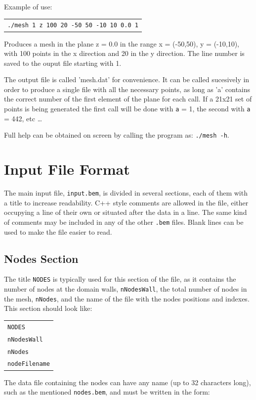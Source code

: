 \documentclass[12pt]{article}
\begin{document}
Example of use:

\begin{tabular}{l}
\texttt{./mesh 1 z 100 20 -50 50 -10 10 0.0 1}
\end{tabular}

Produces a mesh in the plane z = 0.0 in the range x = (-50,50), y = (-10,10), with 100 points in the x direction and 20 in the y direction. The line number is saved to the ouput file starting with 1.

The output file is called 'mesh.dat' for convenience. It can be called sucesively in order to produce a single file with all the necessary points, as long as 'a' contains the correct number of the first element of the plane for each call. If a 21x21 set of points is being generated the first call will be done with \verb+a+ = 1, the second with \verb+a+ = 442, etc \ldots

Full help can be obtained on screen by calling the program as: \texttt{./mesh -h}.

\pagebreak

\section{Input File Format}
The main input file, \verb+input.bem+, is divided in several sections, each of them with a title to increase readability. C++ style comments are allowed in the file, either occupying a line of their own or situated after the data in a line. The same kind of comments may be included in any of the other \verb+.bem+ files. Blank lines can be used to make the file easier to read.

\subsection{Nodes Section}
The title \verb+NODES+ is typically used for this section of the file, as it contains the number of nodes at the domain walls, \verb+nNodesWall+, the total number of nodes in the mesh, \verb+nNodes+,  and the name of the file with the nodes positions and indexes. This section should look like:

\begin{tabular}{l}
\texttt{NODES}\\
\texttt{nNodesWall}\\
\texttt{nNodes}\\
\texttt{nodeFilename}
\end{tabular}

The data file containing the nodes can have any name (up to 32 characters long), such as the mentioned \verb+nodes.bem+, and must be written in the form:
\end{document}
